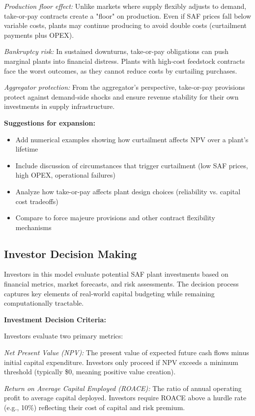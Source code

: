 \documentclass[10.5pt]{article}
\begin{document}
\textit{Production floor effect:} Unlike markets where supply flexibly adjusts to demand, take-or-pay contracts create a "floor" on production. Even if SAF prices fall below variable costs, plants may continue producing to avoid double costs (curtailment payments plus OPEX).

\textit{Bankruptcy risk:} In sustained downturns, take-or-pay obligations can push marginal plants into financial distress. Plants with high-cost feedstock contracts face the worst outcomes, as they cannot reduce costs by curtailing purchases.

\textit{Aggregator protection:} From the aggregator's perspective, take-or-pay provisions protect against demand-side shocks and ensure revenue stability for their own investments in supply infrastructure.

\textbf{Suggestions for expansion:}
\begin{itemize}
    \item Add numerical examples showing how curtailment affects NPV over a plant's lifetime
    \item Include discussion of circumstances that trigger curtailment (low SAF prices, high OPEX, operational failures)
    \item Analyze how take-or-pay affects plant design choices (reliability vs. capital cost tradeoffs)
    \item Compare to force majeure provisions and other contract flexibility mechanisms
\end{itemize}

\subsection{Investor Decision Making}

Investors in this model evaluate potential SAF plant investments based on financial metrics, market forecasts, and risk assessments. The decision process captures key elements of real-world capital budgeting while remaining computationally tractable.

\textbf{Investment Decision Criteria:}

Investors evaluate two primary metrics:

\textit{Net Present Value (NPV):} The present value of expected future cash flows minus initial capital expenditure. Investors only proceed if NPV exceeds a minimum threshold (typically \$0, meaning positive value creation).

\textit{Return on Average Capital Employed (ROACE):} The ratio of annual operating profit to average capital deployed. Investors require ROACE above a hurdle rate (e.g., 10\%) reflecting their cost of capital and risk premium.
\end{document}
